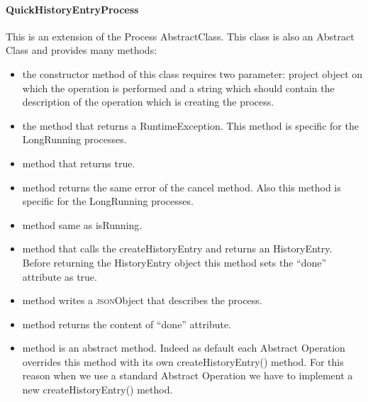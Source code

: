 \paragraph{QuickHistoryEntryProcess} This is an extension of the Process AbstractClass. This class is also an Abstract Class and provides many methods:
\begin{itemize}
	\item the constructor method of this class requires two parameter: project object on which the operation is performed and a string which should contain the description of the operation which is creating the process.
	\item the  method that returns a RuntimeException. This method is specific for the LongRunning processes.
	\item {} method that returns true. 
	\item {} method returns the same error of the cancel method. Also this method is specific for the LongRunning processes.
	\item {} method same as isRunning.
	\item {} method that calls the createHistoryEntry and returns an HistoryEntry. Before returning the HistoryEntry object this method sets the ``done'' attribute as true. 
	\item {} method writes a \textsc{json}Object that describes the process.
	\item {} method returns the content of ``done'' attribute.
	\item {} method is an abstract method. Indeed as default each Abstract Operation overrides this method with its own createHistoryEntry() method. For this reason when we use a standard Abstract Operation we have to implement a new  createHistoryEntry() method.
\end{itemize}

